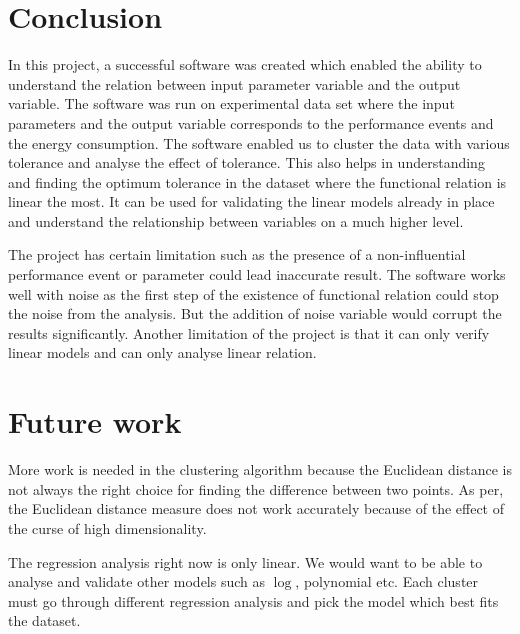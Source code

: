 \section{Conclusion}

In this project, a successful software was created which enabled the ability to understand the relation between input parameter variable and the output variable. The software was run on experimental data set where the input parameters and the output variable corresponds to the performance events and the energy consumption. The software enabled us to cluster the data with various tolerance and analyse the effect of tolerance. This also helps in understanding and finding the optimum tolerance in the dataset where the functional relation is linear the most. It can be used for validating the linear models already in place and understand the relationship between variables on a much higher level.

The project has certain limitation such as the presence of a non-influential performance event or parameter could lead inaccurate result. The software works well with noise as the first step of the existence of functional relation could stop the noise from the analysis. But the addition of noise variable would corrupt the results significantly. Another limitation of the project is that it can only verify linear models and can only analyse linear relation.

\section{Future work}

More work is needed in the clustering algorithm because the Euclidean distance is not always the right choice for finding the difference between two points. As per\cite{aggarwal2001surprising}, the Euclidean distance measure does not work accurately because of the effect of the curse of high dimensionality.

The regression analysis right now is only linear. We would want to be able to analyse and validate other models such as \(\log\), polynomial etc. Each cluster must go through different regression analysis and pick the model which best fits the dataset.